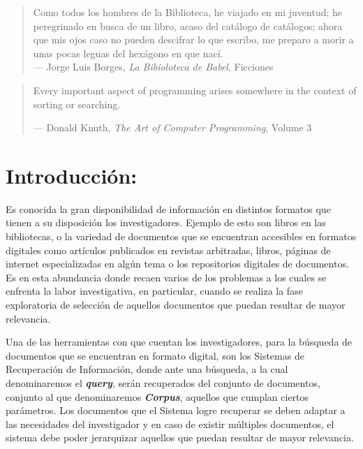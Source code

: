 \documentclass[
  10,
  openany]{book}
\begin{document}
\newpage
\thispagestyle{empty}
\vspace*{5cm}
\hfill
\begin{minipage}{0.70\textwidth}
\begin{quote}
Como todos los hombres de la Biblioteca, he viajado en mi juventud; he peregrinado en busca de un libro, acaso del catálogo de catálogos; ahora que mis ojos caso no pueden descifrar lo que escribo, me preparo a morir a unas pocas leguas del hexágono en que nací.\\
--- Jorge Luis Borges, \textit{La Bibioloteca de Babel}, Ficciones
\end{quote}
\hspace*{2cm}

\begin{quote}
Every important aspect of programming arises somewhere in the context of sorting or searching.

--- Donald Knuth, \textit{The Art of Computer Programming}, Volume 3
\end{quote}
\end{minipage}

\thispagestyle{empty}
\maketitle



{
\setcounter{tocdepth}{3}
\tableofcontents
}
\listoffigures
\listoftables
\clearpage
{}

\hypertarget{introduccion}{%
\chapter{Introducción:}\label{introduccion}}

Es conocida la gran disponibilidad de información en distintos formatos que tienen a su disposición los investigadores. Ejemplo de esto son libros en las bibliotecas, o la variedad de documentos que se encuentran accesibles en formatos digitales como artículos publicados en revistas arbitradas, libros, páginas de internet especializadas en algún tema o los repositorios digitales de documentos. Es en esta abundancia donde recaen varios de los problemas a los cuales se enfrenta la labor investigativa, en particular, cuando se realiza la fase exploratoria de selección de aquellos documentos que puedan resultar de mayor relevancia.

Una de las herramientas con que cuentan los investigadores, para la búsqueda de documentos que se encuentran en formato digital, son los Sistemas de Recuperación de Información, donde ante una búsqueda, a la cual denominaremos el \textbf{\emph{query}}, serán recuperados del conjunto de documentos, conjunto al que denominaremos \textbf{\emph{Corpus}}, aquellos que cumplan ciertos parámetros\citep{manning2008}. Los documentos que el Sistema logre recuperar se deben adaptar a las necesidades del investigador y en caso de existir múltiples documentos, el sistema debe poder jerarquizar aquellos que puedan resultar de mayor relevancia.
\end{document}
